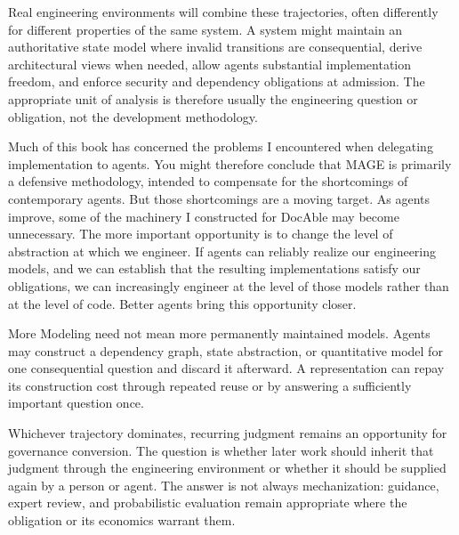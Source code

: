 Real engineering environments will combine these trajectories, often differently for different properties of the same system. A system might maintain an authoritative state model where invalid transitions are consequential, derive architectural views when needed, allow agents substantial implementation freedom, and enforce security and dependency obligations at admission. The appropriate unit of analysis is therefore usually the engineering question or obligation, not the development methodology.

Much of this book has concerned the problems I encountered when delegating implementation to agents. You might therefore conclude that MAGE is primarily a defensive methodology, intended to compensate for the shortcomings of contemporary agents. But those shortcomings are a moving target. As agents improve, some of the machinery I constructed for DocAble may become unnecessary. The more important opportunity is to change the level of abstraction at which we engineer. If agents can reliably realize our engineering models, and we can establish that the resulting implementations satisfy our obligations, we can increasingly engineer at the level of those models rather than at the level of code. Better agents bring this opportunity closer.

More Modeling need not mean more permanently maintained models. Agents may construct a dependency graph, state abstraction, or quantitative model for one consequential question and discard it afterward. A representation can repay its construction cost through repeated reuse or by answering a sufficiently important question once.

Whichever trajectory dominates, recurring judgment remains an opportunity for governance conversion. The question is whether later work should inherit that judgment through the engineering environment or whether it should be supplied again by a person or agent. The answer is not always mechanization: guidance, expert review, and probabilistic evaluation remain appropriate where the obligation or its economics warrant them.

